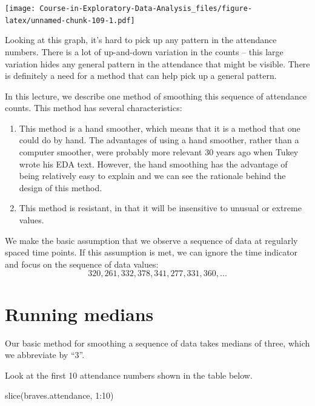 \documentclass[
]{book}
\newenvironment{Shaded}{\begin{snugshade}}{\end{snugshade}}
\newcommand{\DecValTok}[1]{\textcolor[rgb]{0.00,0.00,0.81}{#1}}
\newcommand{\FunctionTok}[1]{\textcolor[rgb]{0.00,0.00,0.00}{#1}}
\newcommand{\NormalTok}[1]{#1}
\newcommand{\SpecialCharTok}[1]{\textcolor[rgb]{0.00,0.00,0.00}{#1}}
\begin{document}
\texttt{[image: Course-in-Exploratory-Data-Analysis\_files/figure-latex/unnamed-chunk-109-1.pdf]}

Looking at this graph, it's hard to pick up any pattern in the attendance numbers. There is a lot of up-and-down variation in the counts -- this large variation hides any general pattern in the attendance that might be visible. There is definitely a need for a method that can help pick up a general pattern.

In this lecture, we describe one method of smoothing this sequence of attendance counts. This method has several characteristics:

\begin{enumerate}
\def\labelenumi{\arabic{enumi}.}
\item
  This method is a hand smoother, which means that it is a method that one could do by hand. The advantages of using a hand smoother, rather than a computer smoother, were probably more relevant 30 years ago when Tukey wrote his EDA text. However, the hand smoothing has the advantage of being relatively easy to explain and we can see the rationale behind the design of this method.
\item
  This method is resistant, in that it will be insensitive to unusual or extreme values.
\end{enumerate}

We make the basic assumption that we observe a sequence of data at regularly spaced time points. If this assumption is met, we can ignore the time indicator and focus on the sequence of data values:
\[
320, 261, 332, 378, 341, 277, 331, 360, ...
\]

\hypertarget{running-medians}{%
\section{Running medians}\label{running-medians}}

Our basic method for smoothing a sequence of data takes medians of three, which we abbreviate by ``3''.

Look at the first 10 attendance numbers shown in the table below.

\begin{Shaded}
\begin{Highlighting}[]
\FunctionTok{slice}\NormalTok{(braves.attendance, }\DecValTok{1}\SpecialCharTok{:}\DecValTok{10}\NormalTok{)}
\end{Highlighting}
\end{Shaded}
\end{document}
